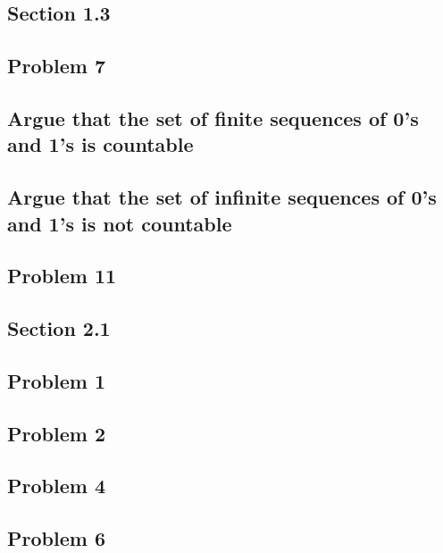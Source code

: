 \documentclass[11pt]{article}
\begin{document}
\subsection*{Section 1.3}
\subsection*{Problem 7}
\subsection*{Argue that the set of finite sequences of 0's and 1's is countable}
\subsection*{Argue that the set of infinite sequences of 0's and 1's is not countable}
\subsection*{Problem 11}

\subsection*{Section 2.1}
\subsection*{Problem 1}
\subsection*{Problem 2}
\subsection*{Problem 4}
\subsection*{Problem 6}
\end{document}

